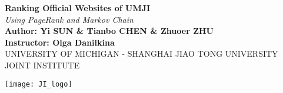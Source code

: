 \documentclass[a0,portrait]{a0poster}
\begin{document}


\begin{minipage}[H]{0.7\linewidth}
\veryHuge \color{NavyBlue} \textbf{Ranking Official Websites of UMJI} \color{Black}\\ %
\Huge\textit{Using PageRank and Markov Chain}\\[2cm] %
\huge \textbf{Author: Yi SUN \& Tianbo CHEN \& Zhuoer ZHU}\\
\huge \textbf{Instructor: Olga Danilkina}\\[0.5cm] %
\Large UNIVERSITY OF MICHIGAN - SHANGHAI JIAO TONG UNIVERSITY JOINT INSTITUTE\\[0.4cm] %
\end{minipage}
%
\begin{minipage}[l]{0.3\linewidth}
\texttt{[image: JI\_logo]}\\
\end{minipage}

\vspace{1cm} %

\end{document}
